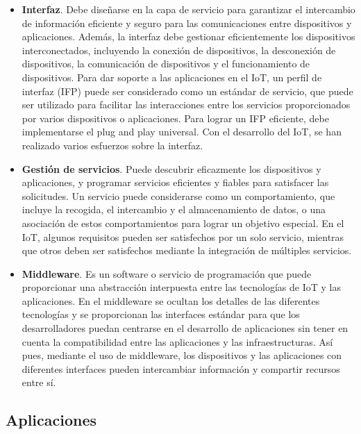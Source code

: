 {\begin{itemize}
    \item \textbf{Interfaz}. Debe diseñarse en la capa de servicio para garantizar el intercambio de información eficiente y seguro para las comunicaciones entre dispositivos y aplicaciones. Además, la interfaz debe gestionar eficientemente los dispositivos interconectados, incluyendo la conexión de dispositivos, la desconexión de dispositivos, la comunicación de dispositivos y el funcionamiento de dispositivos. Para dar soporte a las aplicaciones en el IoT, un perfil de interfaz (IFP) puede ser considerado como un estándar de servicio, que puede ser utilizado para facilitar las interacciones entre los servicios proporcionados por varios dispositivos o aplicaciones. Para lograr un IFP eficiente, debe implementarse el plug and play universal. Con el desarrollo del IoT, se han realizado varios esfuerzos sobre la interfaz.
    \item \textbf{Gestión de servicios}. Puede descubrir eficazmente los dispositivos y aplicaciones, y programar servicios eficientes y fiables para satisfacer las solicitudes. Un servicio puede considerarse como un comportamiento, que incluye la recogida, el intercambio y el almacenamiento de datos, o una asociación de estos comportamientos para lograr un objetivo especial. En el IoT, algunos requisitos pueden ser satisfechos por un solo servicio, mientras que otros deben ser satisfechos mediante la integración de múltiples servicios.
    \item \textbf{Middleware}. Es un software o servicio de programación que puede proporcionar una abstracción interpuesta entre las tecnologías de IoT y las aplicaciones. En el middleware se ocultan los detalles de las diferentes tecnologías y se proporcionan las interfaces estándar para que los desarrolladores puedan centrarse en el desarrollo de aplicaciones sin tener en cuenta la compatibilidad entre las aplicaciones y las infraestructuras. Así pues, mediante el uso de middleware, los dispositivos y las aplicaciones con diferentes interfaces pueden intercambiar información y compartir recursos entre sí. \cite{lin2017survey}
\end{itemize}


\subsection{Aplicaciones}

}
